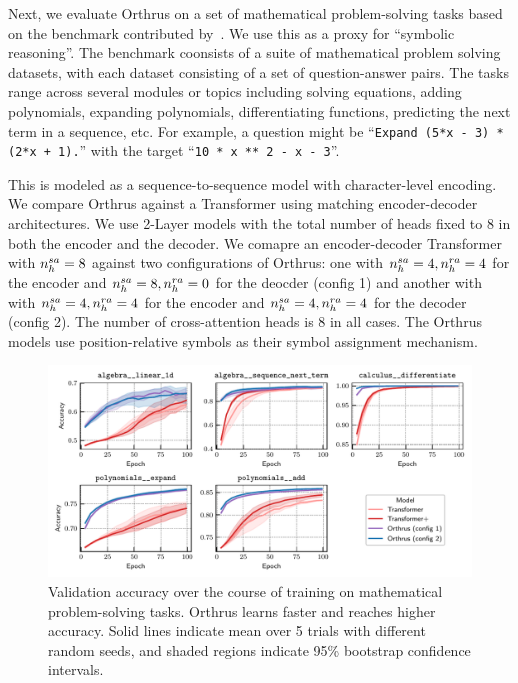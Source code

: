 Next, we evaluate Orthrus on a set of mathematical problem-solving tasks based on the benchmark contributed by~\citet{saxtonAnalyzingMathematicalReasoning2019}. We use this as a proxy for ``symbolic reasoning''. The benchmark coonsists of a suite of mathematical problem solving datasets, with each dataset consisting of a set of question-answer pairs. The tasks range across several modules or topics including solving equations, adding polynomials, expanding polynomials, differentiating functions, predicting the next term in a sequence, etc. For example, a question might be ``\texttt{Expand (5*x - 3) * (2*x + 1).}'' with the target ``\texttt{10 * x ** 2 - x - 3}''.

This is modeled as a sequence-to-sequence model with character-level encoding. We compare Orthrus against a Transformer using matching encoder-decoder architectures. We use 2-Layer models with the total number of heads fixed to $8$ in both the encoder and the decoder. We comapre an encoder-decoder Transformer with $n_h^{sa} = 8$ against two configurations of Orthrus: one with $n_h^{sa} = 4, n_h^{ra} = 4$ for the encoder and $n_h^{sa} = 8, n_h^{ra} = 0$ for the deocder (config 1) and another with with $n_h^{sa} = 4, n_h^{ra} = 4$ for the encoder and $n_h^{sa} = 4, n_h^{ra} = 4$ for the decoder (config 2). The number of cross-attention heads is $8$ in all cases. The Orthrus models use position-relative symbols as their symbol assignment mechanism.

\begin{figure}
    \includegraphics[width=\textwidth]{figs/experiments/math/math_training_curves_interpolation.pdf}
    \caption{Validation accuracy over the course of training on mathematical problem-solving tasks. Orthrus learns faster and reaches higher accuracy. Solid lines indicate mean over 5 trials with different random seeds, and shaded regions indicate 95\% bootstrap confidence intervals.}\label{fig:math_training_curves_interpolation}
\end{figure}

